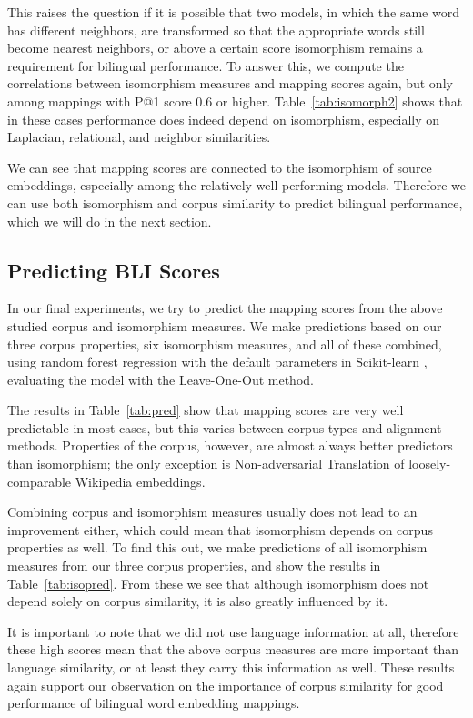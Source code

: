 \documentclass[11pt]{article}
\begin{document}
    This raises the question if it is possible that two models, in which the same word has different neighbors, are transformed so that the appropriate words still become nearest neighbors, or above a certain score isomorphism remains a requirement for bilingual performance. To answer this, we compute the correlations between isomorphism measures and mapping scores again, but only among mappings with P@1 score 0.6 or higher. Table~\ref{tab:isomorph2} shows that in these cases performance does indeed depend on isomorphism, especially on Laplacian, relational, and neighbor similarities. 
    
    We can see that mapping scores are connected to the isomorphism of source embeddings, especially among the relatively well performing models. Therefore we can use both isomorphism and corpus similarity to predict bilingual performance, which we will do in the next section.
    

\subsection{Predicting BLI Scores}
    In our final experiments, we try to predict the mapping scores from the above studied corpus and isomorphism measures. We make predictions based on our three corpus properties, six isomorphism measures, and all of these combined, using random forest regression with the default parameters in Scikit-learn \cite{scikit-learn}, evaluating the model with the Leave-One-Out method. 
    
    The results in Table~\ref{tab:pred} show that mapping scores are very well predictable in most cases, but this varies between corpus types and alignment methods. Properties of the corpus, however, are almost always better predictors than isomorphism; the only exception is Non-adversarial Translation of loosely-comparable Wikipedia embeddings. 
    
    Combining corpus and isomorphism measures usually does not lead to an improvement either, which could mean that isomorphism depends on corpus properties as well. To find this out, we make predictions of all isomorphism measures from our three corpus properties, and show the results in Table~\ref{tab:isopred}. From these we see that although isomorphism does not depend solely on corpus similarity, it is also greatly influenced by it.
    
    It is important to note that we did not use language information at all, therefore these high scores mean that the above corpus measures are more important than language similarity, or at least they carry this information as well. These results again support our observation on the importance of corpus similarity for good performance of bilingual word embedding mappings.
    
\end{document}
